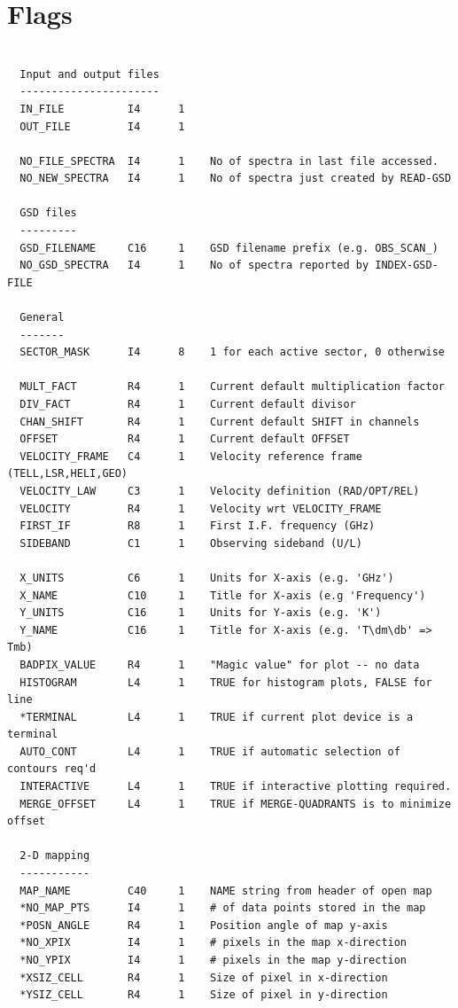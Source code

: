 \documentclass[11pt,twoside]{report}
\begin{document}
\section{Flags}
\begin{verbatim}

  Input and output files
  ----------------------
  IN_FILE          I4      1
  OUT_FILE         I4      1

  NO_FILE_SPECTRA  I4      1    No of spectra in last file accessed.
  NO_NEW_SPECTRA   I4      1    No of spectra just created by READ-GSD

  GSD files
  ---------
  GSD_FILENAME     C16     1    GSD filename prefix (e.g. OBS_SCAN_)
  NO_GSD_SPECTRA   I4      1    No of spectra reported by INDEX-GSD-FILE

  General
  -------
  SECTOR_MASK      I4      8    1 for each active sector, 0 otherwise

  MULT_FACT        R4      1    Current default multiplication factor
  DIV_FACT         R4      1    Current default divisor
  CHAN_SHIFT       R4      1    Current default SHIFT in channels
  OFFSET           R4      1    Current default OFFSET
  VELOCITY_FRAME   C4      1    Velocity reference frame (TELL,LSR,HELI,GEO)
  VELOCITY_LAW     C3      1    Velocity definition (RAD/OPT/REL)
  VELOCITY         R4      1    Velocity wrt VELOCITY_FRAME
  FIRST_IF         R8      1    First I.F. frequency (GHz)
  SIDEBAND         C1      1    Observing sideband (U/L)

  X_UNITS          C6      1    Units for X-axis (e.g. 'GHz')
  X_NAME           C10     1    Title for X-axis (e.g 'Frequency')
  Y_UNITS          C16     1    Units for Y-axis (e.g. 'K')
  Y_NAME           C16     1    Title for X-axis (e.g. 'T\dm\db' => Tmb)
  BADPIX_VALUE     R4      1    "Magic value" for plot -- no data
  HISTOGRAM        L4      1    TRUE for histogram plots, FALSE for line
  *TERMINAL        L4      1    TRUE if current plot device is a terminal
  AUTO_CONT        L4      1    TRUE if automatic selection of contours req'd
  INTERACTIVE      L4      1    TRUE if interactive plotting required.
  MERGE_OFFSET     L4      1    TRUE if MERGE-QUADRANTS is to minimize offset

  2-D mapping
  -----------
  MAP_NAME         C40     1    NAME string from header of open map
  *NO_MAP_PTS      I4      1    # of data points stored in the map
  *POSN_ANGLE      R4      1    Position angle of map y-axis
  *NO_XPIX         I4      1    # pixels in the map x-direction
  *NO_YPIX         I4      1    # pixels in the map y-direction
  *XSIZ_CELL       R4      1    Size of pixel in x-direction
  *YSIZ_CELL       R4      1    Size of pixel in y-direction


\end{verbatim}
\end{document}
